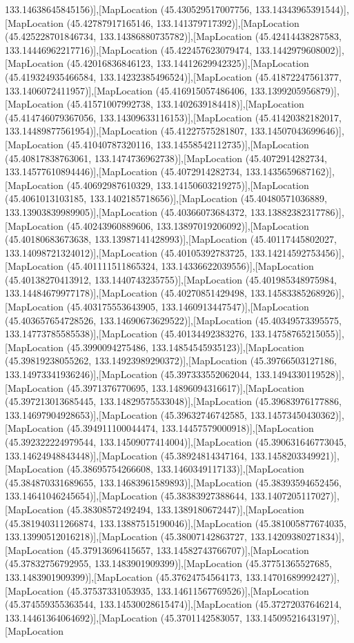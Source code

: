 133.14638645845156)],[MapLocation (45.430529517007756, 133.14343965391544)],[MapLocation (45.42787917165146, 133.141379717392)],[MapLocation (45.425228701846734, 133.14386880735782)],[MapLocation (45.42414438287583, 133.14446962217716)],[MapLocation (45.422457623079474, 133.1442979608002)],[MapLocation (45.42016836846123, 133.14412629942325)],[MapLocation (45.419324935466584, 133.14232385496524)],[MapLocation (45.41872247561377, 133.1406072411957)],[MapLocation (45.416915057486406, 133.1399205956879)],[MapLocation (45.41571007992738, 133.1402639184418)],[MapLocation (45.414746079367056, 133.14309633116153)],[MapLocation (45.41420382182017, 133.14489877561954)],[MapLocation (45.41227575281807, 133.14507043699646)],[MapLocation (45.41040787320116, 133.14558542112735)],[MapLocation (45.40817838763061, 133.1474736962738)],[MapLocation (45.4072914282734, 133.14577610894446)],[MapLocation (45.4072914282734, 133.1435659687162)],[MapLocation (45.40692987610329, 133.14150603219275)],[MapLocation (45.4061013103185, 133.1402185718656)],[MapLocation (45.40480571036889, 133.13903839989905)],[MapLocation (45.40366073684372, 133.13882382317786)],[MapLocation (45.40243960889606, 133.13897019206092)],[MapLocation (45.40180683673638, 133.13987141428993)],[MapLocation (45.40117445802027, 133.14098721324012)],[MapLocation (45.40105392783725, 133.14214592753456)],[MapLocation (45.401111511865324, 133.14336622039556)],[MapLocation (45.40138270413912, 133.1440743235755)],[MapLocation (45.401985348975984, 133.14484679977178)],[MapLocation (45.40270851429498, 133.14583385268926)],[MapLocation (45.403175553643905, 133.1460913447547)],[MapLocation (45.403657654728526, 133.14690673629522)],[MapLocation (45.40349573395575, 133.14773785585538)],[MapLocation (45.40134492383276, 133.14758765215055)],[MapLocation (45.3990094275486, 133.14854545935123)],[MapLocation (45.39819238055262, 133.14923989290372)],[MapLocation (45.39766503127186, 133.14973341936246)],[MapLocation (45.397333552062044, 133.1494330119528)],[MapLocation (45.3971376770695, 133.14896094316617)],[MapLocation (45.397213013685445, 133.14829575533048)],[MapLocation (45.39683976177886, 133.14697904928653)],[MapLocation (45.39632746742585, 133.14573450430362)],[MapLocation (45.394911100044474, 133.14457579000918)],[MapLocation (45.392322224979544, 133.14509077414004)],[MapLocation (45.390631646773045, 133.14624948843448)],[MapLocation (45.38924814347164, 133.1458203349921)],[MapLocation (45.38695754266608, 133.1460349117133)],[MapLocation (45.384870331689655, 133.14683961589893)],[MapLocation (45.38393594652456, 133.14641046245654)],[MapLocation (45.38383927388644, 133.1407205117027)],[MapLocation (45.38308572492494, 133.1389180672447)],[MapLocation (45.381940311266874, 133.13887515190046)],[MapLocation (45.381005877674035, 133.13990512016218)],[MapLocation (45.38007142863727, 133.14209380271834)],[MapLocation (45.37913696415657, 133.14582743766707)],[MapLocation (45.37832756792955, 133.1483901909399)],[MapLocation (45.37751365527685, 133.1483901909399)],[MapLocation (45.37624754564173, 133.14701689992427)],[MapLocation (45.37537331053935, 133.14611567769526)],[MapLocation (45.374559355363544, 133.14530028615474)],[MapLocation (45.37272037646214, 133.14461364064692)],[MapLocation (45.3701142583057, 133.14509521643197)],[MapLocation 